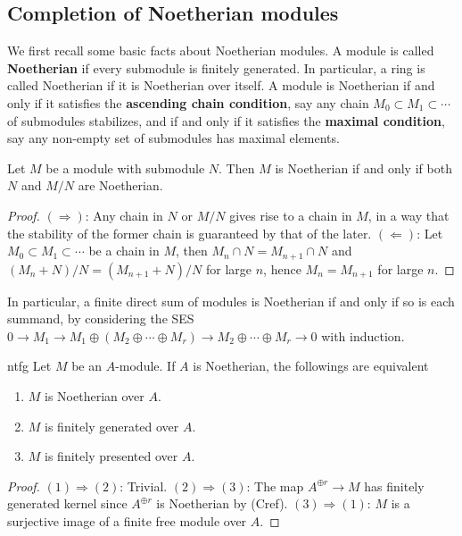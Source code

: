 \documentclass[10pt]{extarticle}
\begin{document}
\subsection{Completion of Noetherian modules}

We first recall some basic facts about Noetherian modules. A module is called \textbf{Noetherian} if every submodule is finitely generated. In particular, a ring is called Noetherian if it is Noetherian over itself. A module is Noetherian if and only if it satisfies the \textbf{ascending chain condition}, say any chain $M_0\subset M_1\subset\cdots$ of submodules stabilizes, and if and only if it satisfies the \textbf{maximal condition}, say any non-empty set of submodules has maximal elements. 

\begin{proposition}{}{}
    Let $M$ be a module with submodule $N$. Then $M$ is Noetherian if and only if both $N$ and $M/N$ are Noetherian.
\end{proposition}
\begin{proof}
    $(\Rightarrow)$: Any chain in $N$ or $M/N$ gives rise to a chain in $M$, in a way that the stability of the former chain is guaranteed by that of the later. $(\Leftarrow)$: Let $M_0\subset M_1\subset\cdots$ be a chain in $M$, then $M_n\cap N=M_{n+1}\cap N$ and $(M_n+N)/N=(M_{n+1}+N)/N$ for large $n$, hence $M_n=M_{n+1}$ for large $n$.
\end{proof}

In particular, a finite direct sum of modules is Noetherian if and only if so is each summand, by considering the SES $0\to M_1\to M_1\oplus (M_2\oplus\cdots\oplus M_r)\to M_2\oplus\cdots\oplus M_r\to 0$ with induction.

\begin{proposition}{}{ntfg}
    Let $M$ be an $A$-module. If $A$ is Noetherian, the followings are equivalent
    \begin{enumerate}
        \item $M$ is Noetherian over $A$.
        \item $M$ is finitely generated over $A$.
        \item $M$ is finitely presented over $A$.
    \end{enumerate}
\end{proposition}
\begin{proof}
    $(1)\Rightarrow(2)$: Trivial. $(2)\Rightarrow(3)$: The map $A^{\oplus r}\to M$ has finitely generated kernel since $A^{\oplus r}$ is Noetherian by (Cref). $(3)\Rightarrow(1)$: $M$ is a surjective image of a finite free module over $A$.
\end{proof}
\end{document}

